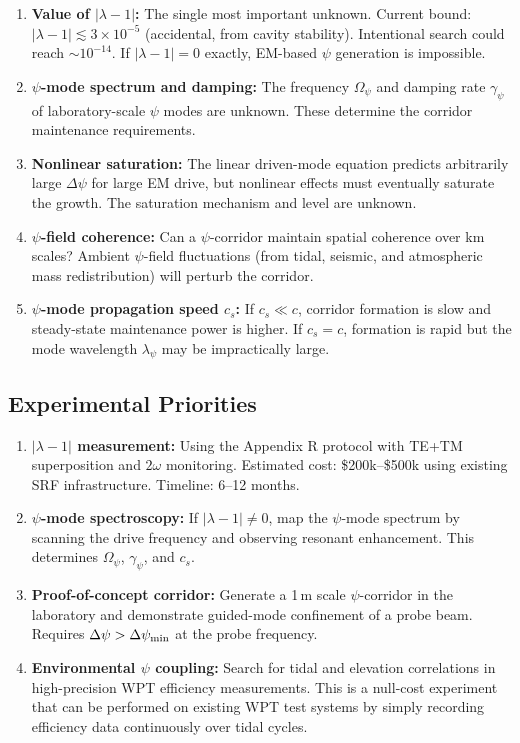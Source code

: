 \documentclass[11pt,a4paper]{article}
\begin{document}
\begin{enumerate}
\item \textbf{Value of $|\lambda - 1|$:} The single most important
unknown. Current bound: $|\lambda-1| \lesssim 3 \times 10^{-5}$
(accidental, from cavity stability). Intentional search could reach
$\sim 10^{-14}$. If $|\lambda - 1| = 0$ exactly, EM-based $\psi$
generation is impossible.

\item \textbf{$\psi$-mode spectrum and damping:} The frequency
$\Omega_\psi$ and damping rate $\gamma_\psi$ of laboratory-scale
$\psi$ modes are unknown. These determine the corridor maintenance
requirements.

\item \textbf{Nonlinear saturation:} The linear driven-mode equation
predicts arbitrarily large $\Delta\psi$ for large EM drive, but
nonlinear effects must eventually saturate the growth. The saturation
mechanism and level are unknown.

\item \textbf{$\psi$-field coherence:} Can a $\psi$-corridor maintain
spatial coherence over km scales? Ambient $\psi$-field fluctuations
(from tidal, seismic, and atmospheric mass redistribution) will
perturb the corridor.

\item \textbf{$\psi$-mode propagation speed $c_s$:} If $c_s \ll c$,
corridor formation is slow and steady-state maintenance power is
higher. If $c_s = c$, formation is rapid but the mode wavelength
$\lambda_\psi$ may be impractically large.
\end{enumerate}

\subsection{Experimental Priorities}

\begin{enumerate}
\item \textbf{$|\lambda - 1|$ measurement:} Using the Appendix R
protocol with TE+TM superposition and $2\omega$ monitoring.
Estimated cost: \$200k--\$500k using existing SRF infrastructure.
Timeline: 6--12 months.

\item \textbf{$\psi$-mode spectroscopy:} If $|\lambda - 1| \neq 0$,
map the $\psi$-mode spectrum by scanning the drive frequency and
observing resonant enhancement. This determines $\Omega_\psi$,
$\gamma_\psi$, and $c_s$.

\item \textbf{Proof-of-concept corridor:} Generate a 1\,m scale
$\psi$-corridor in the laboratory and demonstrate guided-mode
confinement of a probe beam. Requires $\Delta\psi > \Delta\psi_{\rm min}$
at the probe frequency.

\item \textbf{Environmental $\psi$ coupling:} Search for tidal and
elevation correlations in high-precision WPT efficiency measurements.
This is a null-cost experiment that can be performed on existing
WPT test systems by simply recording efficiency data continuously
over tidal cycles.
\end{enumerate}
\end{document}
